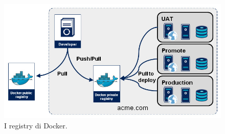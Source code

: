 \begin{figure}[H]
	\begin{center}
		\includegraphics[width=0.99\columnwidth]{img/ContainersOperations-2_fig01.jpg}
		\caption{I registry di Docker.}
		\label{img:registry}
	\end{center}
\end{figure}


